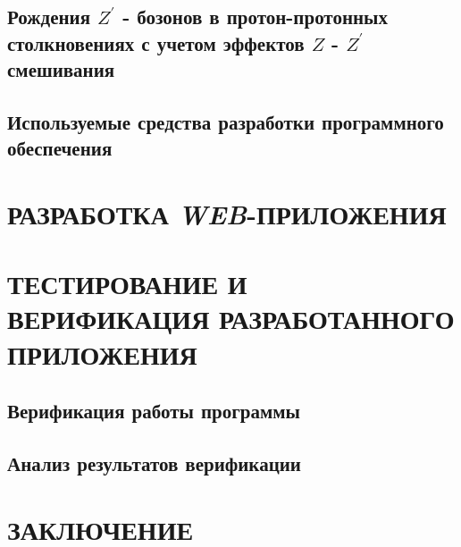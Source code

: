 \documentclass[12pt,a4paper]{styles/report}
\begin{document}
\section{Рождения $Z^\prime$ - бозонов в протон-протонных столкновениях с учетом эффектов $Z$ - $Z^\prime$ смешивания}


\section{Используемые средства разработки программного обеспечения}



\chapter{РАЗРАБОТКА \textit{WEB}-ПРИЛОЖЕНИЯ}


\chapter{ТЕСТИРОВАНИЕ И ВЕРИФИКАЦИЯ РАЗРАБОТАННОГО ПРИЛОЖЕНИЯ}
\section{Верификация работы программы}

\section{Анализ результатов верификации}


\newpage
\chapter*{ЗАКЛЮЧЕНИЕ}


\newpage
\begin{thebibliography}{9999.}



\end{thebibliography}


\end{document}
